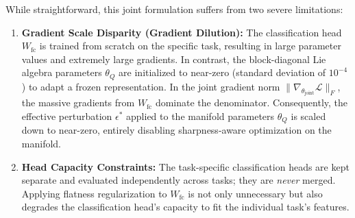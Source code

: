 \documentclass{article}
\theoremstyle{plain}
\theoremstyle{definition}
\theoremstyle{remark}
\begin{document}
While straightforward, this joint formulation suffers from two severe limitations:
\begin{enumerate}
    \item \textbf{Gradient Scale Disparity (Gradient Dilution):} The classification head $W_{\text{fc}}$ is trained from scratch on the specific task, resulting in large parameter values and extremely large gradients. In contrast, the block-diagonal Lie algebra parameters $\theta_Q$ are initialized to near-zero (standard deviation of $10^{-4}$) to adapt a frozen representation. In the joint gradient norm $\|\nabla_{\theta_{\text{joint}}} \mathcal{L}\|_F$, the massive gradients from $W_{\text{fc}}$ dominate the denominator. Consequently, the effective perturbation $\epsilon^*$ applied to the manifold parameters $\theta_Q$ is scaled down to near-zero, entirely disabling sharpness-aware optimization on the manifold.
    \item \textbf{Head Capacity Constraints:} The task-specific classification heads are kept separate and evaluated independently across tasks; they are \textit{never} merged. Applying flatness regularization to $W_{\text{fc}}$ is not only unnecessary but also degrades the classification head's capacity to fit the individual task's features.
\end{enumerate}
\end{document}
